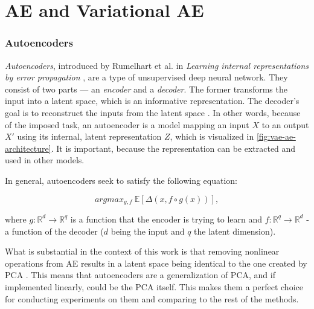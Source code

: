 \section{AE and Variational AE}

\subsubsection{Autoencoders}\label{subsubsec:autoencoders}
\textit{Autoencoders}, introduced by Rumelhart et al. in \textit{Learning internal representations by error propagation}
\cite{Rumelhart1986}, are a type of unsupervised deep neural network. They consist of two parts — an \textit{encoder} and a \textit{decoder}. The former transforms the input into a latent space, which is an informative representation. The decoder's goal is to reconstruct the inputs from the latent space \cite{Bank2020}. In other words, because of the imposed task, an autoencoder is a model mapping an input $X$ to an output $X'$ using its internal, latent representation $Z$, which is visualized in  \autoref{fig:vae-ae-architecture}. It is important, because the representation can be extracted and used in other models.

\vspace{\baselineskip}
In general, autoencoders seek to satisfy the following equation:

\begin{equation}
    argmax_{g,f}\:\mathbb{E}\left[\Delta(x, f \circ g(x))\right],
\end{equation}

\noindent where $g: \mathbb{R}^d \rightarrow \mathbb{R}^q$ is a function that the encoder is trying to learn and $f: \mathbb{R}^q \rightarrow \mathbb{R}^d$ - a function of the decoder ($d$ being the input and $q$ the latent dimension).

\vspace{\baselineskip}
What is substantial in the context of this work is that removing nonlinear operations from AE results in a latent space being identical to the one created by PCA \cite{Plaut2018}. This means that autoencoders are a generalization of PCA, and if implemented linearly, could be the PCA itself. This makes them a perfect choice for conducting experiments on them and comparing to the rest of the methods.

